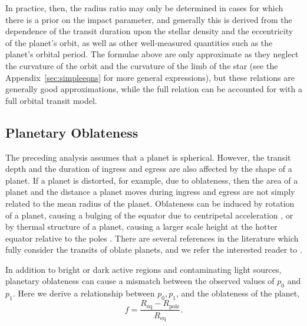 In practice, then, the radius ratio may only be determined in cases for which
there is a prior on the impact parameter, and generally this is derived from
the dependence of the transit duration upon the stellar density and the eccentricity
of the planet's orbit, as well as other well-measured quantities such as the
planet's orbital period.  The formulae above are only approximate as they neglect
the curvature of the orbit and the curvature of the limb of the star (see the
Appendix~\ref{sec:simpleeqns} for more general expressions), but these
relations are generally good approximations, while the full relation can be
accounted for with a full orbital transit model.

\subsection{Planetary Oblateness}

The preceding analysis assumes that a planet is spherical.  However, the
transit depth and the duration of ingress and egress are also affected by
the shape of a planet.  If a planet is distorted, for example, due to 
oblateness, then the area of a planet and the distance a planet moves 
during ingress and egress are not simply related to the mean radius of the planet.
Oblateness can be induced by rotation of a planet, causing a bulging of
the equator due to centripetal acceleration \citet{Barnes2003}, or by thermal structure 
of a planet, causing a larger scale height at the hotter equator
relative to the poles \citep{DobbsDixon2012}.  
There are several references in the literature which fully consider the 
transits of oblate planets, and we refer the interested reader to  
\citet{Hui2002,Barnes2003,Carter2010,Zhu2014,Biersteker2017}. 

In addition to bright or dark active regions and contaminating light sources, planetary oblateness can cause a mismatch between the observed values of $p_0$ and $p_1$. Here we derive a relationship between $p_0, p_1$, and the oblateness of the planet,
\begin{equation}
    f = \frac{R_\mathrm{eq} - R_\mathrm{pole}}{R_\mathrm{eq}}.
\end{equation}

